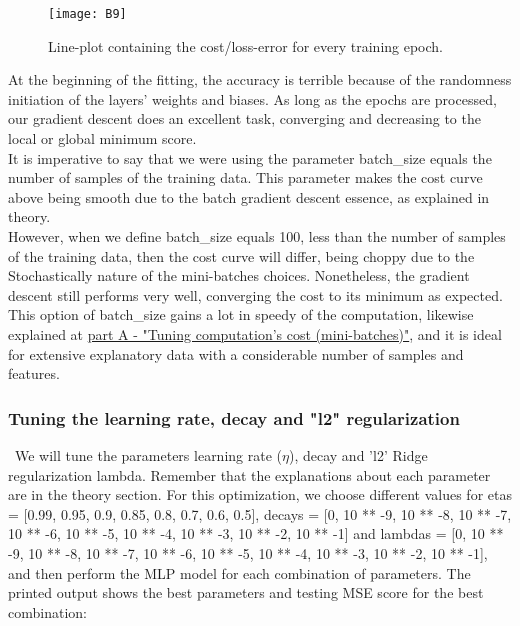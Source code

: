\begin{figure}[H]
\label{fig:B6}
\centering
\texttt{[image: B9]}
\caption{Line-plot containing the cost/loss-error for every training epoch.}
\end{figure}

At the beginning of the fitting, the accuracy is terrible because of the randomness initiation of the layers' weights and biases. As long as the epochs are processed, our gradient descent does an excellent task, converging and decreasing to the local or global minimum score.\\

It is imperative to say that we were using the parameter batch\_size equals the number of samples of the training data. This parameter makes the cost curve above being smooth due to the batch gradient descent essence, as explained in theory.\\

However, when we define batch\_size equals 100, less than the number of samples of the training data, then the cost curve will differ, being choppy due to the Stochastically nature of the mini-batches choices. Nonetheless, the gradient descent still performs very well, converging the cost to its minimum as expected. This option of batch\_size gains a lot in speedy of the computation, likewise explained at \hyperref[chap:Tuning computation's cost (mini-batches)]{part A - "Tuning computation's cost (mini-batches)"}, and it is ideal for extensive explanatory data with a considerable number of samples and features.

\subsubsection{Tuning the learning rate, decay and "l2" regularization}
\label{chap:Tuning the learning rate, decay and "l2" regularization}

\qquad \, We will tune the parameters learning rate ($\eta$), decay and 'l2' Ridge regularization lambda. Remember that the explanations about each parameter are in the theory section. For this optimization, we choose different values for etas = [0.99, 0.95, 0.9, 0.85, 0.8, 0.7, 0.6, 0.5], decays = [0, 10 ** -9, 10 ** -8, 10 ** -7, 10 ** -6, 10 ** -5, 10 ** -4, 10 ** -3, 10 ** -2, 10 ** -1] and lambdas = [0, 10 ** -9, 10 ** -8, 10 ** -7, 10 ** -6, 10 ** -5, 10 ** -4, 10 ** -3, 10 ** -2, 10 ** -1], and then perform the MLP model for each combination of parameters. The printed output shows the best parameters and testing MSE score for the best combination:

